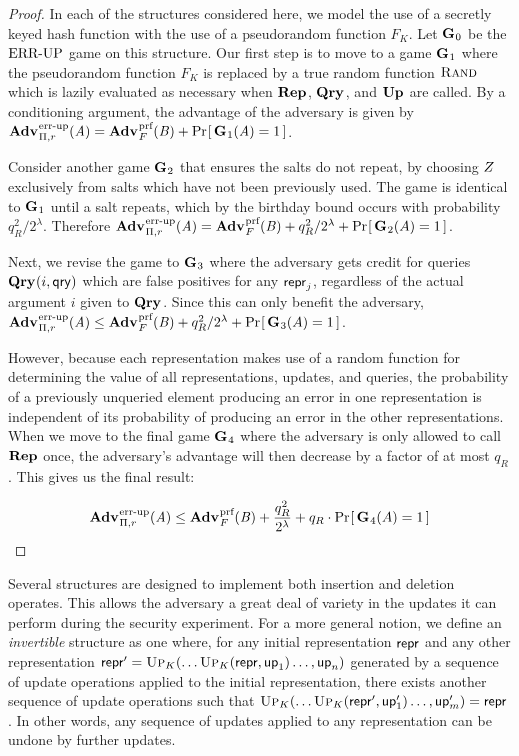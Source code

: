\begin{proof}
In each of the structures considered here, we model the use of a secretly keyed hash function with the use of a pseudorandom function $F_K$. Let $\mathbf{G}\hspace{0.5pt}_0$ be the $\textnormal{ERR\mbox{-}UP}$ game on this structure. Our first step is to move to a game $\mathbf{G}\hspace{0.5pt}_1$ where the pseudorandom function $F_K$ is replaced by a true random function $\textsc{Rand}$ which is lazily evaluated as necessary when $\mathbf{Rep}\hspace{0.5pt}$, $\mathbf{Qry}\hspace{0.5pt}$, and $\mathbf{Up}\hspace{0.5pt}$ are called. By a conditioning argument, the advantage of the adversary is given by $\Adv{\errep}_{\struct,r}(\advA) = \Adv{\prf}_F(\advB) + \Prob{\G_1(\advA)=1}$.

Consider another game $\mathbf{G}\hspace{0.5pt}_2$ that ensures the salts do not repeat, by choosing $Z$ exclusively from salts which have not been previously used. The game is identical to $\mathbf{G}\hspace{0.5pt}_1$ until a salt repeats, which by the birthday bound occurs with probability $q_R^2/2^\lambda$. Therefore $\Adv{\errep}_{\struct,r}(\advA) = \Adv{\prf}_F(\advB) + q_R^2/2^\lambda + \Prob{\G_2(A) = 1}$.

Next, we revise the game to $\mathbf{G}\hspace{0.5pt}_3$ where the adversary gets credit for queries $\mathbf{Qry}\hspace{0.5pt}(i,\mathsf{qry})$ which are false positives for any $\mathsf{repr}_j$, regardless of the actual argument $i$ given to $\mathbf{Qry}\hspace{0.5pt}$. Since this can only benefit the adversary, $\Adv{\errep}_{\struct,r}(\advA) \le \Adv{\prf}_F(\advB) + q_R^2/2^\lambda + \Prob{\G_3(A) = 1}$.

However, because each representation makes use of a random function for determining the value of all representations, updates, and queries, the probability of a previously unqueried element producing an error in one representation is independent of its probability of producing an error in the other representations. When we move to the final game $\mathbf{G}\hspace{0.5pt}_4$ where the adversary is only allowed to call $\mathbf{Rep}\hspace{0.5pt}$ once, the adversary's advantage will then decrease by a factor of at most $q_R$. This gives us the final result:

$$\Adv{\errep}_{\struct,r}(\advA) \le \Adv{\prf}_F(\advB) + \frac{q_R^2}{2^\lambda} + q_R \cdot \Prob{\G_4(A) = 1}$$\missingqed
\end{proof}


Several structures are designed to implement both insertion and deletion operates. This allows the adversary a great deal of variety in the updates it can perform during the security experiment. For a more general notion, we define an \textit{invertible} structure as one where, for any initial representation $\mathsf{repr}$ and any other representation $\mathsf{repr}' = \textsc{Up}_K(\ldots\textsc{Up}_K(\mathsf{repr},\mathsf{up}_1)\ldots,\mathsf{up}_n)$ generated by a sequence of update operations applied to the initial representation, there exists another sequence of update operations such that $\textsc{Up}_K(\ldots\textsc{Up}_K(\mathsf{repr}',\mathsf{up}'_1)\ldots,\mathsf{up}'_m) = \mathsf{repr}$. In other words, any sequence of updates applied to any representation can be undone by further updates.

